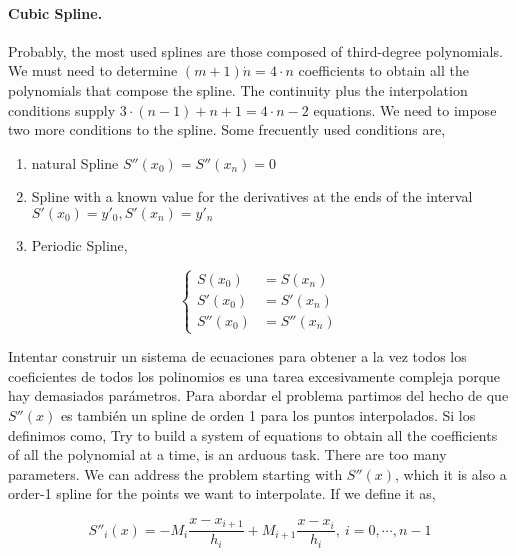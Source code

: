 \begin{paracol}{2}
\paragraph{Cubic Spline.} Probably, the most used splines are those composed of third-degree polynomials. We must need to determine $(m+1)\dot n = 4\cdot n$ coefficients to obtain all the polynomials that compose the spline. The continuity plus the interpolation conditions supply $3\cdot (n-1)+n+1 = 4\cdot n - 2$ equations. We need to impose two more conditions to the spline. Some frecuently used conditions are,
\begin{enumerate}
	\item natural Spline $S''(x_0)=S''(x_n)=0$
	\item Spline with a known value for the derivatives at the ends of the interval $S'(x_0)=y'_0, S'(x_n)=y'_n$
	\item Periodic Spline,
\end{enumerate}  
\end{paracol}     
\begin{equation*}
\left\{ 
\begin{aligned}
S(x_0)&=S(x_n)\\
S'(x_0)&=S'(x_n)\\
S''(x_0)&=S''(x_n)
\end{aligned}
\right.
\end{equation*}
\begin{paracol}{2}
Intentar construir un sistema de ecuaciones para obtener a la vez todos los coeficientes de todos los polinomios es una tarea excesivamente compleja porque hay demasiados parámetros.  Para abordar el problema partimos del hecho de que $S''(x)$ es también un spline de orden 1 para los puntos interpolados. Si los definimos como,
\switchcolumn
Try to build a system of equations to obtain all the coefficients of all the polynomial at a time, is an arduous task. There are too many parameters. We can address the problem starting with $S''(x)$, which it is also a order-1 spline for the points we want to interpolate. If we define it as,  
\end{paracol}
\begin{equation*}
S''_i(x)=-M_i\frac{x-x_{i+1}}{h_i}+M_{i+1}\frac{x-x_i}{h_i},\   i=0,\cdots, n-1
\end{equation*}

